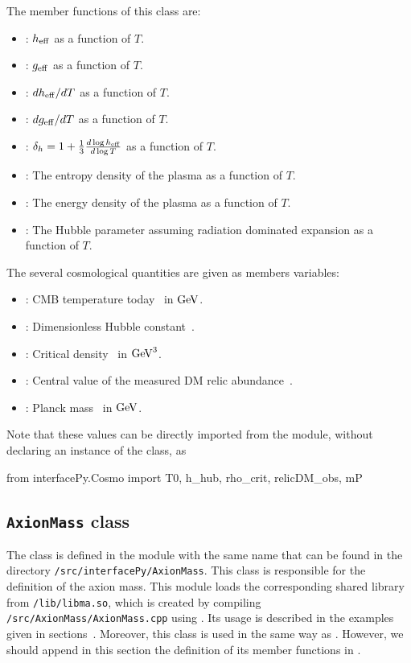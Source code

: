 \documentclass[11pt,a4paper]{article}
\begin{document}
The member functions of this class are:
%
\begin{itemize}
	\item {}: $h_{\rm eff}{}$ as a function of $T$.
	\item {}: $g_{\rm eff}{}$ as a function of $T$.
	\item {}: $dh_{\rm eff}{}/dT$ as a function of $T$.
	\item {}: $dg_{\rm eff}{}/dT$ as a function of $T$.
	\item {}: $\delta_h = 1 + \frac{1}{3} \frac{d\log h_{\rm eff}{}}{d\log T}$ as a function of $T$.
	\item {}: The entropy density of the plasma as a function of $T$.
	\item {}: The energy density of the plasma as a function of $T$.
	\item {}: The Hubble parameter assuming radiation dominated expansion as a function of $T$.
\end{itemize}

The several cosmological quantities are given as members variables:
%
\begin{itemize}
	\item {}: CMB temperature today~\cite{Zyla:2020zbs} in ${\rm GeV}$.
	\item {}: Dimensionless Hubble constant~\cite{Zyla:2020zbs}.
	\item {}: Critical density~\cite{Zyla:2020zbs} in ${\rm GeV}^3$.
	\item {}: Central value of the measured DM relic abundance~\cite{Planck:2018vyg}.
	\item {}: Planck mass~\cite{Zyla:2020zbs} in ${\rm GeV}$.
\end{itemize}

Note that these values can be directly imported from the module, without declaring an instance of the class, as 
%
\begin{py}
	from interfacePy.Cosmo import T0, h_hub, rho_crit, relicDM_obs, mP
\end{py}

\subsection{{\tt AxionMass} class}
%
The  class is defined in the module with the same name that can be found in the directory {\tt \mimes/src/interfacePy/AxionMass}. This class is responsible for the definition of the axion mass. This module loads the corresponding shared library from {\tt \mimes/lib/libma.so}, which is created by compiling {\tt \mimes/src/AxionMass/AxionMass.cpp} using . 
%
Its usage is described in the examples given in sections~. Moreover, this class is used in the same way as . However, we should append in this section the definition of its member functions in \PY.
\end{document}
